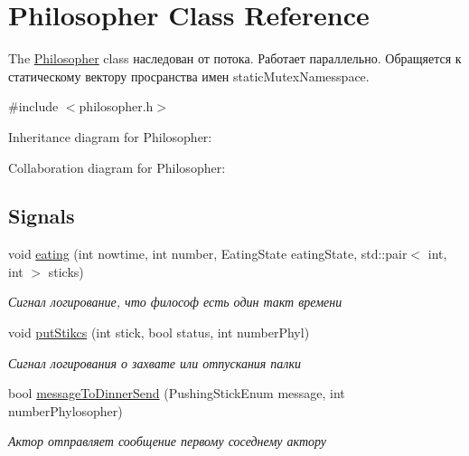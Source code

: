 \hypertarget{classPhilosopher}{}\section{Philosopher Class Reference}
\label{classPhilosopher}


The \hyperlink{classPhilosopher}{Philosopher} class наследован от потока. Работает параллельно. Обращяется к статическому вектору просранства имен static\+Mutex\+Namesspace.  




{\ttfamily \#include $<$philosopher.\+h$>$}



Inheritance diagram for Philosopher\+:


Collaboration diagram for Philosopher\+:
\subsection*{Signals}
\begin{DoxyCompactItemize}
\item 
\mbox{\label{classPhilosopher_a4e6247cdd138aba7b9af45c2ee632296}} 
void \hyperlink{classPhilosopher_a4e6247cdd138aba7b9af45c2ee632296}{eating} (int nowtime, int number, Eating\+State eating\+State, std\+::pair$<$ int, int $>$ sticks)
\begin{DoxyCompactList}\small\item\em Сигнал логирование, что философ есть один такт времени \end{DoxyCompactList}\item 
\mbox{\label{classPhilosopher_a8051031e0290fcff4525585937666cef}} 
void \hyperlink{classPhilosopher_a8051031e0290fcff4525585937666cef}{put\+Stikcs} (int stick, bool status, int number\+Phyl)
\begin{DoxyCompactList}\small\item\em Сигнал логирования о захвате или отпускания палки \end{DoxyCompactList}\item 
\mbox{\label{classPhilosopher_a1293af3509f4e6275734b79cd7be3f60}} 
bool \hyperlink{classPhilosopher_a1293af3509f4e6275734b79cd7be3f60}{message\+To\+Dinner\+Send} (Pushing\+Stick\+Enum message, int number\+Phylosopher)
\begin{DoxyCompactList}\small\item\em Актор отправляет сообщение первому соседнему актору \end{DoxyCompactList}\end{DoxyCompactItemize}
